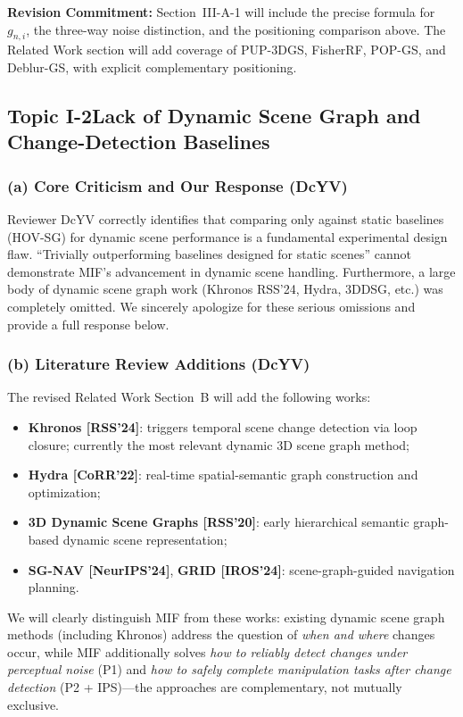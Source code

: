\documentclass[10pt,a4paper]{article}
\newcommand{\revs}[1]{\smallskip\noindent{\small\color{notegray}\textit{Addressed to: #1}}\smallskip}
\newcommand{\commitbox}[1]{\smallskip\noindent\textbf{Revision Commitment:} #1\smallskip}
\begin{document}
\commitbox{Section~III-A-1 will include the precise formula for $g_{n,i}$, the three-way noise distinction, and the positioning comparison above. The Related Work section will add coverage of PUP-3DGS, FisherRF, POP-GS, and Deblur-GS, with explicit complementary positioning.}

\subsection*{Topic I-2\enspace Lack of Dynamic Scene Graph and Change-Detection Baselines}
\revs{ijfV (E2), DcYV (Q1, Q4, Q8)}

\subsubsection*{(a) Core Criticism and Our Response (DcYV)}

Reviewer DcYV correctly identifies that comparing only against static baselines (HOV-SG) for dynamic scene performance is a fundamental experimental design flaw. ``Trivially outperforming baselines designed for static scenes'' cannot demonstrate MIF's advancement in dynamic scene handling. Furthermore, a large body of dynamic scene graph work (Khronos RSS'24, Hydra, 3DDSG, etc.) was completely omitted. We sincerely apologize for these serious omissions and provide a full response below.

\subsubsection*{(b) Literature Review Additions (DcYV)}

The revised Related Work Section~B will add the following works:
\begin{itemize}[leftmargin=1.8em,topsep=2pt,itemsep=1pt]
  \item \textbf{Khronos [RSS'24]}: triggers temporal scene change detection via loop closure; currently the most relevant dynamic 3D scene graph method;
  \item \textbf{Hydra [CoRR'22]}: real-time spatial-semantic graph construction and optimization;
  \item \textbf{3D Dynamic Scene Graphs [RSS'20]}: early hierarchical semantic graph-based dynamic scene representation;
  \item \textbf{SG-NAV [NeurIPS'24]}, \textbf{GRID [IROS'24]}: scene-graph-guided navigation planning.
\end{itemize}
We will clearly distinguish MIF from these works: existing dynamic scene graph methods (including Khronos) address the question of \emph{when and where} changes occur, while MIF additionally solves \emph{how to reliably detect changes under perceptual noise} (P1) and \emph{how to safely complete manipulation tasks after change detection} (P2 + IPS)---the approaches are complementary, not mutually exclusive.
\end{document}
